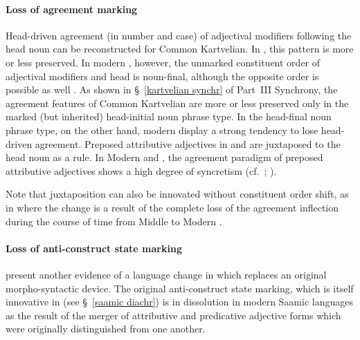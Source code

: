 {\paragraph{Loss of agreement marking}
Head\hyp{}driven agreement (in number and case) of adjectival modifiers following the head noun can be reconstructed for Common Kartvelian. In , this pattern is more or less preserved. In modern , however, the unmarked constituent order of adjectival modifiers and head is noun-final, although the opposite order is possible as well \citep[56]{harris1991a}.  As shown in \S~\ref{kartvelian synchr} of Part~III Synchrony, the agreement features of Common Kartvelian are more or less preserved only in the marked (but inherited) head-initial noun phrase type. In the head-final noun phrase type, on the other hand, modern  display a strong tendency to lose head\hyp{}driven agreement. Preposed attributive adjectives in  and  are juxtaposed to the head noun as a rule. In Modern  and , the agreement paradigm of preposed attributive adjectives shows a high degree of syncretism (cf.~\citealt[56]{harris1991a}; \citealt[56–60, elsewhere]{tuite1998}).

Note that juxtaposition can also be innovated without constituent order shift, as in  where the change is a result of the complete loss of the agreement inflection during the course of time from Middle to Modern . 

\paragraph{Loss of anti\hyp{}construct state marking}
 present another evidence of a language change in which  replaces an original morpho-syntactic device. The original anti\hyp{}construct state marking, which is itself innovative in  (see \S~\ref{saamic diachr}) is in dissolution in modern Saamic languages as the result of the merger of attributive and predicative adjective forms which were originally distinguished from one another.


}
